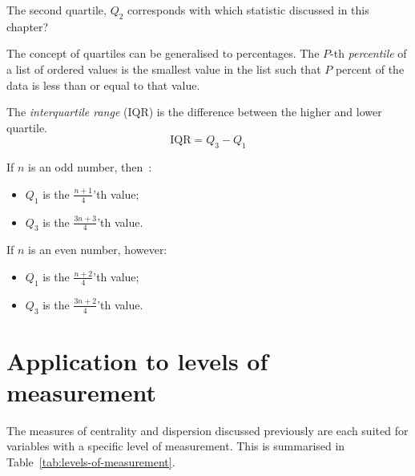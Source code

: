 \begin{exercise}
  \label{ex:q2}
  The second quartile, $Q_2$ corresponds with which statistic discussed in this chapter?
\end{exercise}

The concept of quartiles can be generalised to percentages. The $P$-th \emph{percentile} of a list of ordered values is the smallest value in the list such that $P$ percent of the data is less than or equal to that value.

\begin{definition}
  The \emph{interquartile range} (IQR) is the difference between the higher and lower quartile.
  \begin{equation}
    \mathrm{IQR} = Q_3 - Q_1
    \label{eq:iqr@}
  \end{equation}
\end{definition}

If $n$ is an odd number, then~\autocite{Moore2002}:
\begin{itemize}
  \item $Q_{1}$ is the $\frac{n+1}{4}$'th value;
  \item $Q_{3}$ is the $\frac{3n+3}{4}$'th value.
\end{itemize}

If $n$ is an even number, however:
\begin{itemize}
  \item $Q_{1}$ is the $\frac{n+2}{4}$'th value;
  \item $Q_{3}$ is the $\frac{3n+2}{4}$'th value.
\end{itemize}

\section{Application to levels of measurement}
\label{sec:application-to-levels-of-measurement}

The measures of centrality and dispersion discussed previously are each suited for variables with a specific level of measurement. This is summarised in Table~\ref{tab:levels-of-measurement}.

